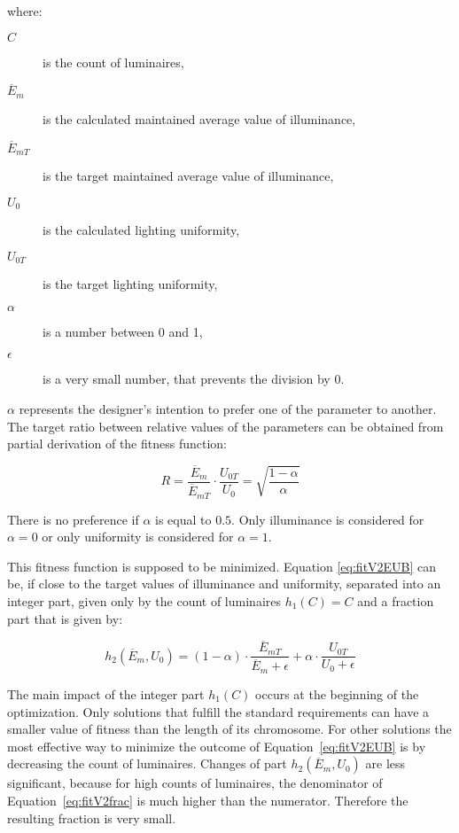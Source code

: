 \noindent where:
\begin{description}
	\item[$C$] is the count of luminaires,
	\item[$\overline{E}_{m}$] is the calculated maintained average value of illuminance,
	\item[$\overline{E}_{mT}$] is the target maintained average value of illuminance,
	\item[$U_0$] is the calculated lighting uniformity,
	\item[$U_{0T}$] is the target lighting uniformity,
	\item[$\alpha$] is a number between 0 and 1,
	\item[$\epsilon$] is a very small number, that prevents the division by 0.
\end{description}

$\alpha$ represents the designer's intention to prefer one of the parameter to another. The target ratio between relative values of the parameters can be obtained from partial derivation of the fitness function:

\begin{equation}
\label{eq:fitV2ratio}
R =\frac{\overline{E}_{m}}{\overline{E}_{mT}}\cdot\frac{U_{0T}}{U_0}=\sqrt{\frac{1-\alpha}{\alpha}}
\end{equation}

\noindent There is no preference if $\alpha$ is equal to $0.5$. Only illuminance is considered for $\alpha = 0$ or only uniformity is considered for $\alpha = 1$.

This fitness function is supposed to be minimized. Equation \ref{eq:fitV2EUB} can be, if close to the target values of illuminance and uniformity, separated into an integer part, given only by the count of luminaires $h_1\left(C\right)= C$ and a fraction part that is given by:

\begin{equation}
\label{eq:fitV2frac}
	h_2\left(\overline{E}_{m}, U_0\right)= \left( 1 - \alpha\right)\cdot\frac{\overline{E}_{mT}}{\overline{E}_{m}+\epsilon} + \alpha\cdot\frac{U_{0T}}{U_0 + \epsilon}
\end{equation}

The main impact of the integer part $h_1\left(C\right)$ occurs at the beginning of the optimization. Only solutions that fulfill the standard requirements can have a smaller value of fitness than the length of its chromosome. For other solutions the most effective way to minimize the outcome of Equation~\ref{eq:fitV2EUB} is by decreasing the count of luminaires. Changes of part $h_2\left(\overline{E}_{m}, U_0\right)$ are less significant, because for high counts of luminaires, the denominator of Equation~\ref{eq:fitV2frac} is much higher than the numerator. Therefore the resulting fraction is very small.

